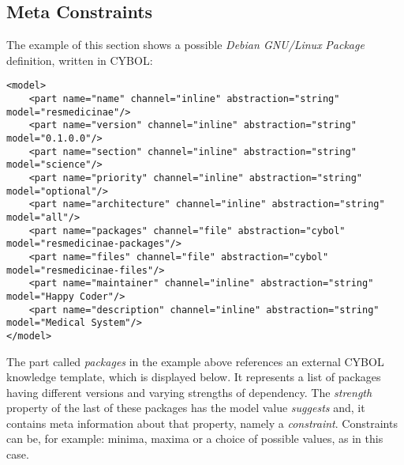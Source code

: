 %
%
%
%
%
%

\subsection{Meta Constraints}
\label{meta_constraints_heading}

The example of this section shows a possible \emph{Debian GNU/Linux}
\cite{debian} \emph{Package} definition, written in CYBOL:

\begin{scriptsize}
    \begin{verbatim}
<model>
    <part name="name" channel="inline" abstraction="string" model="resmedicinae"/>
    <part name="version" channel="inline" abstraction="string" model="0.1.0.0"/>
    <part name="section" channel="inline" abstraction="string" model="science"/>
    <part name="priority" channel="inline" abstraction="string" model="optional"/>
    <part name="architecture" channel="inline" abstraction="string" model="all"/>
    <part name="packages" channel="file" abstraction="cybol" model="resmedicinae-packages"/>
    <part name="files" channel="file" abstraction="cybol" model="resmedicinae-files"/>
    <part name="maintainer" channel="inline" abstraction="string" model="Happy Coder"/>
    <part name="description" channel="inline" abstraction="string" model="Medical System"/>
</model>
    \end{verbatim}
\end{scriptsize}

The part called \emph{packages} in the example above references an external
CYBOL knowledge template, which is displayed below. It represents a list of
packages having different versions and varying strengths of dependency. The
\emph{strength} property of the last of these packages has the model value
\emph{suggests} and, it contains meta information about that property, namely
a \emph{constraint}. Constraints can be, for example: minima, maxima or a
choice of possible values, as in this case.

